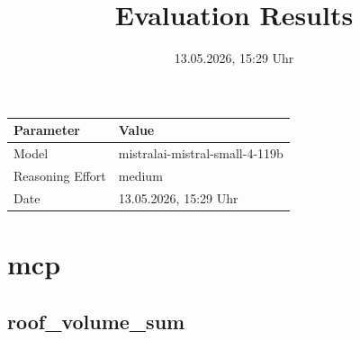 \documentclass[a4paper,11pt]{article}
\title{Evaluation Results}
\date{13.05.2026, 15:29 Uhr}
\begin{document}
\maketitle

\begin{table}[H]
\centering
\begin{tabular}{l l}
\toprule
\textbf{Parameter} & \textbf{Value} \\
\midrule
Model & mistralai-mistral-small-4-119b \\
Reasoning Effort & medium \\
Date & 13.05.2026, 15:29 Uhr \\
\bottomrule
\end{tabular}
\end{table}

\tableofcontents
\clearpage

\section{mcp}

\subsection{roof\_volume\_sum}
\end{document}
